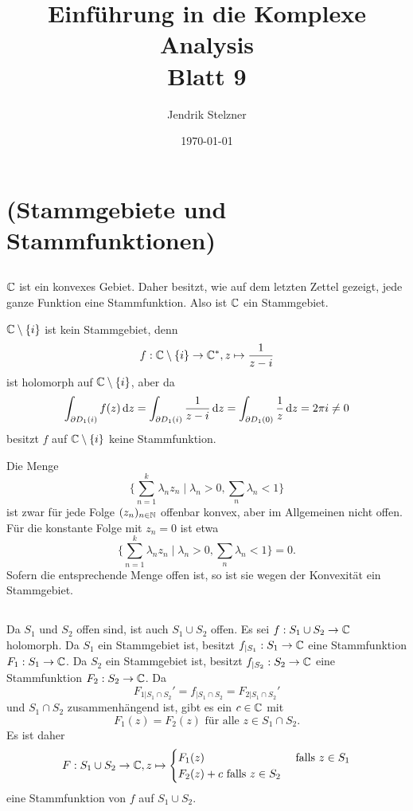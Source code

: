 \documentclass[a4paper,10pt]{article}
\title{Einführung in die Komplexe Analysis \\ \Large Blatt 9}
\author{Jendrik Stelzner}
\date{\today}
\begin{document}
\maketitle




\section{(Stammgebiete und Stammfunktionen)}


\subsection{}
$\mathbb{C}$ ist ein konvexes Gebiet. Daher besitzt, wie auf dem letzten Zettel gezeigt, jede ganze Funktion eine Stammfunktion. Also ist $\mathbb{C}$ ein Stammgebiet.

$\mathbb{C} \setminus \{i\}$ ist kein Stammgebiet, denn
\[
 f : \mathbb{C} \setminus \{i\} \to \mathbb{C}^*, z \mapsto \frac{1}{z-i}
\]
ist holomorph auf $\mathbb{C} \setminus \{i\}$, aber da
\[
 \int_{\partial D_1(i)} f(z) \,\text{d}z
 = \int_{\partial D_1(i)} \frac{1}{z-i} \,\text{d}z
 = \int_{\partial D_1(0)} \frac{1}{z} \,\text{d}z
 = 2 \pi i
 \neq 0
\]
besitzt $f$ auf $\mathbb{C} \setminus \{i\}$ keine Stammfunktion.

Die Menge
\[
 \{ \sum_{n=1}^k \lambda_n z_n \mid \lambda_n > 0, \sum_n \lambda_n < 1 \}
\]
ist zwar für jede Folge $(z_n)_{n \in \mathbb{N}}$ offenbar konvex, aber im Allgemeinen nicht offen. Für die konstante Folge mit $z_n = 0$ ist etwa
\[
 \{ \sum_{n=1}^k \lambda_n z_n \mid \lambda_n > 0, \sum_n \lambda_n < 1 \} = 0.
\]
Sofern die entsprechende Menge offen ist, so ist sie wegen der Konvexität ein Stammgebiet.




\subsection{}
Da $S_1$ und $S_2$ offen sind, ist auch $S_1 \cup S_2$ offen. Es sei $f : S_1 \cup S_2 \to \mathbb{C}$ holomorph. Da $S_1$ ein Stammgebiet ist, besitzt $f_{|S_1} : S_1 \to \mathbb{C}$ eine Stammfunktion $F_1 : S_1 \to \mathbb{C}$. Da $S_2$ ein Stammgebiet ist, besitzt $f_{|S_2} : S_2 \to \mathbb{C}$ eine Stammfunktion $F_2 : S_2 \to \mathbb{C}$. Da
\[
 F_{1 | S_1 \cap S_2}' = f_{|S_1 \cap S_2} = F_{2 | S_1 \cap S_2}'
\]
und $S_1 \cap S_2$ zusammenhängend ist, gibt es ein $c \in \mathbb{C}$ mit
\[
 F_1(z) = F_2(z) \text{ für alle } z \in S_1 \cap S_2.
\]
Es ist daher
\[
 F : S_1 \cup S_2 \to \mathbb{C},
 z \mapsto \begin{cases} F_1(z) & \text{ falls } z \in S_1 \\ F_2(z) + c \text{ falls } z \in S_2 \end{cases}
\]
eine Stammfunktion von $f$ auf $S_1 \cup S_2$.
\end{document}
